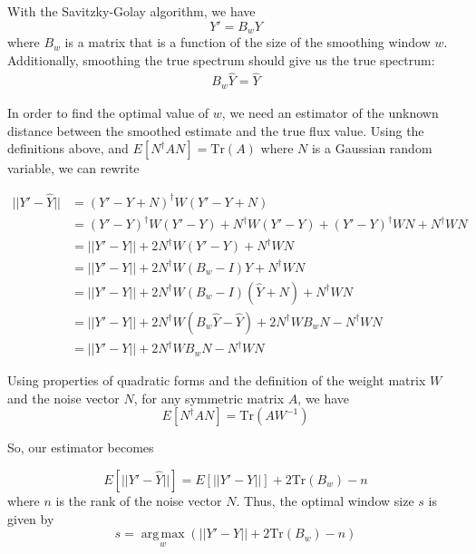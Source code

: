 With the Savitzky-Golay algorithm, we have
\begin{equation}
    Y' = B_wY
\end{equation}
where $B_w$ is a matrix that is a function of the size of the smoothing window $w$. Additionally, smoothing the true spectrum should give us the true spectrum:
\begin{align}
    B_w\hat{Y}=\hat{Y}
\end{align}

In order to find the optimal value of $w$, we need an estimator of the unknown distance between the smoothed estimate and the true flux value. Using the definitions above, and $E[N^\dagger A N]=\mathrm{Tr}(A)$ where $N$ is a Gaussian random variable, we can rewrite

\begin{align*}
    ||Y'-\hat{Y}|| &= (Y'-Y+N)^\dagger W(Y'-Y+N)\\
    &= (Y'-Y)^\dagger W(Y'-Y)+N^\dagger W(Y'-Y) + (Y'-Y)^\dagger W N + N^\dagger W N\\
    &= ||Y'-Y||+2N^\dagger W(Y'-Y)+N^\dagger WN\\
    &= ||Y'-Y||+2N^\dagger W(B_w - I)Y + N^\dagger WN\\
    &= ||Y'-Y||+2N^\dagger W(B_w - I)(\hat{Y}+N) + N^\dagger WN\\
    &= ||Y'-Y||+2N^\dagger W (B_w\hat{Y}-\hat{Y}) + 2N^\dagger W B_w N - N^\dagger W N\\
    &= ||Y'-Y|| + 2N^\dagger W B_w N - N^\dagger W N
\end{align*}

Using properties of quadratic forms and the definition of the weight matrix $W$ and the noise vector $N$, for any symmetric matrix $A$, we have
\begin{equation}
    E[N^\dagger A N] = \mathrm{Tr}(AW^{-1})
\end{equation}

So, our estimator becomes

\begin{equation}
    E[||Y'-\hat{Y}||] = E[||Y'-Y||] + 2 \mathrm{Tr}(B_w) - n
\end{equation}
where $n$ is the rank of the noise vector $N$. Thus, the optimal window size $s$ is given by
\begin{equation}
    s = \operatorname*{arg\,max}_w \left(||Y'-Y|| + 2 \mathrm{Tr}(B_w) - n\right)
\end{equation}


